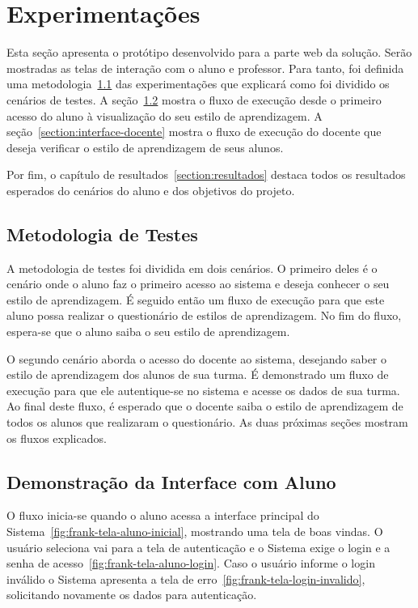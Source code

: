\chapter{Experimentações}

Esta seção apresenta o protótipo desenvolvido para a parte web da solução. Serão mostradas as telas de interação com o aluno e professor. Para tanto, foi definida uma metodologia~\ref{section:metodologia-testes} das experimentações que explicará como foi dividido os cenários de testes.
A seção~\ref{section:interface-aluno} mostra o fluxo de execução desde o primeiro acesso do aluno à visualização do seu estilo de aprendizagem. A seção~\ref{section:interface-docente} mostra o fluxo de execução do docente que deseja verificar o estilo de aprendizagem de seus alunos.

Por fim, o capítulo de resultados~\ref{section:resultados} destaca todos os resultados esperados do cenários do aluno e dos objetivos do projeto.

\section{Metodologia de Testes}\label{section:metodologia-testes}

A metodologia de testes foi dividida em dois cenários. O primeiro deles é o cenário onde o aluno faz o primeiro acesso ao sistema e deseja conhecer o seu estilo de aprendizagem. É seguido então um fluxo de execução para que este aluno possa realizar o questionário de estilos de aprendizagem. No fim do fluxo, espera-se que o aluno saiba o seu estilo de aprendizagem.

O segundo cenário aborda o acesso do docente ao sistema, desejando saber o estilo de aprendizagem dos alunos de sua turma. É demonstrado um fluxo de execução para que ele autentique-se no sistema e acesse os dados de sua turma. Ao final deste fluxo, é esperado que o docente saiba o estilo de aprendizagem de todos os alunos que realizaram o questionário.
As duas próximas seções mostram os fluxos explicados.

\section{Demonstração da Interface com Aluno}\label{section:interface-aluno}
O fluxo inicia-se quando o aluno acessa a interface principal do Sistema~\ref{fig:frank-tela-aluno-inicial}, mostrando uma tela de boas vindas. O usuário seleciona vai para a tela de autenticação e o Sistema exige o login e a senha de acesso~\ref{fig:frank-tela-aluno-login}. Caso o usuário informe o login inválido o Sistema apresenta a tela de erro~\ref{fig:frank-tela-login-invalido}, solicitando novamente os dados para autenticação.

